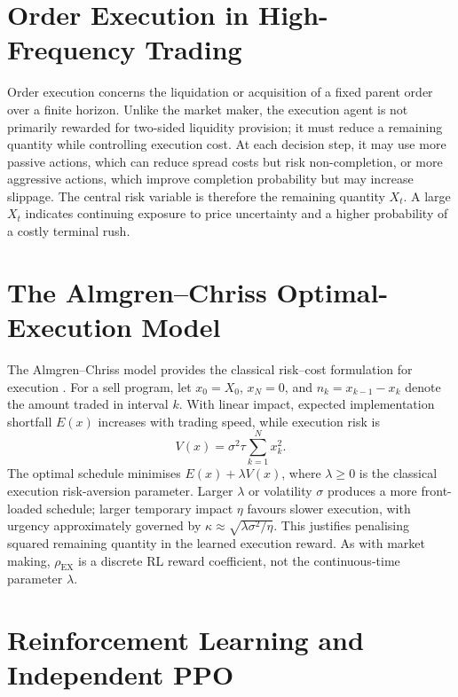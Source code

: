 \documentclass[oneside]{uva-inf-bachelor-thesis}
\begin{document}
\section{Order Execution in High-Frequency Trading}
\label{sec:order_execution}

Order execution concerns the liquidation or acquisition of a fixed parent order over a
finite horizon. Unlike the market maker, the execution agent is not primarily rewarded
for two-sided liquidity provision; it must reduce a remaining quantity while controlling
execution cost. At each decision step, it may use more passive actions, which can
reduce spread costs but risk non-completion, or more aggressive actions, which
improve completion probability but may increase slippage. The central risk variable is
therefore the remaining quantity \(X_t\). A large \(X_t\) indicates continuing exposure
to price uncertainty and a higher probability of a costly terminal rush.

\section{The Almgren--Chriss Optimal-Execution Model}
\label{sec:almgren_chriss}

The Almgren--Chriss model provides the classical risk--cost formulation for execution
\cite{almgren2000}. For a sell program, let \(x_0=X_0\), \(x_N=0\), and
\(n_k=x_{k-1}-x_k\) denote the amount traded in interval \(k\). With linear impact,
expected implementation shortfall \(E(x)\) increases with trading speed, while
execution risk is
\begin{equation}
    V(x)=\sigma^2\tau\sum_{k=1}^{N}x_k^2.
    \label{eq:ac_variance_short}
\end{equation}
The optimal schedule minimises \(E(x)+\lambda V(x)\), where \(\lambda\geq 0\) is the
classical execution risk-aversion parameter. Larger \(\lambda\) or volatility \(\sigma\)
produces a more front-loaded schedule; larger temporary impact \(\eta\) favours slower
execution, with urgency approximately governed by
\(\kappa\approx\sqrt{\lambda\sigma^2/\eta}\). This justifies penalising squared
remaining quantity in the learned execution reward. As with market making,
\(\rho_{\mathrm{EX}}\) is a discrete RL reward coefficient, not the continuous-time
parameter \(\lambda\).

\section{Reinforcement Learning and Independent PPO}
\label{sec:ippo}
\end{document}
